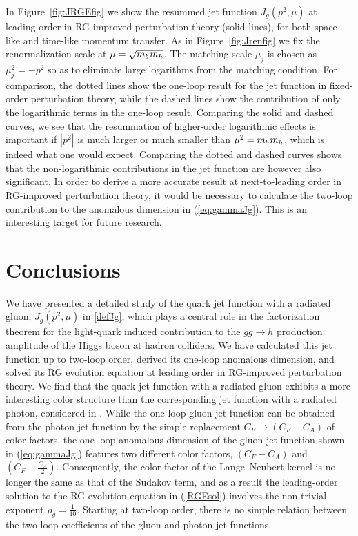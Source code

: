 \documentclass[12pt]{article}
\newcommand{\spac}{{\hspace{0.3mm}}}
\numberwithin{equation}{section}
\begin{document}
In Figure~\ref{fig:JRGEfig} we show the resummed jet function $J_g(p^2,\mu)$ at leading-order in RG-improved perturbation theory (solid lines), for both space-like and time-like momentum transfer. As in Figure~\ref{fig:Jrenfig} we fix the renormalization scale at $\mu=\sqrt{m_b\spac m_h}$. The matching scale $\mu_j$ is chosen as $\mu_j^2=-p^2$ so as to eliminate large logarithms from the matching condition. For comparison, the dotted lines show the one-loop result for the jet function in fixed-order perturbation theory, while the dashed lines show the contribution of only the logarithmic terms in the one-loop result. Comparing the solid and dashed curves, we see that the resummation of higher-order logarithmic effects is important if $|p^2|$ is much larger or much smaller than $\mu^2=m_b\spac m_h$, which is indeed what one would expect. Comparing the dotted and dashed curves shows that the non-logarithmic contributions in the jet function are however also significant. In order to derive a more accurate result at next-to-leading order in RG-improved perturbation theory, it would be necessary to calculate the two-loop contribution to the anomalous dimension in (\ref{eq:gammaJg}). This is an interesting target for future research.


\section{Conclusions} 

We have presented a detailed study of the quark jet function with a radiated gluon, $J_g(p^2,\mu)$ in \eqref{defJg}, which plays a central role in the factorization theorem for the light-quark induced contribution to the $gg\to h$ production amplitude of the Higgs boson at hadron colliders. We have calculated this jet function up to two-loop order, derived its one-loop anomalous dimension, and solved its RG evolution equation at leading order in RG-improved perturbation theory. We find that the quark jet function with a radiated gluon exhibits a more interesting color structure than the corresponding jet function with a radiated photon, considered in \cite{Liu:2020ydl}. While the one-loop gluon jet function can be obtained from the photon jet function by the simple replacement $C_F\to(C_F-C_A)$ of color factors, the one-loop anomalous dimension of the gluon jet function shown in (\ref{eq:gammaJg}) features two different color factors, $(C_F-C_A)$ and $(C_F-\frac{C_A}{2})$. Consequently, the color factor of the Lange--Neubert kernel is no longer the same as that of the Sudakov term, and as a result the leading-order solution to the RG evolution equation in (\ref{RGEsol}) involves the non-trivial exponent $\rho_g=\frac{1}{10}$. Starting at two-loop order, there is no simple relation between the two-loop coefficients of the gluon and photon jet functions.
\end{document}
